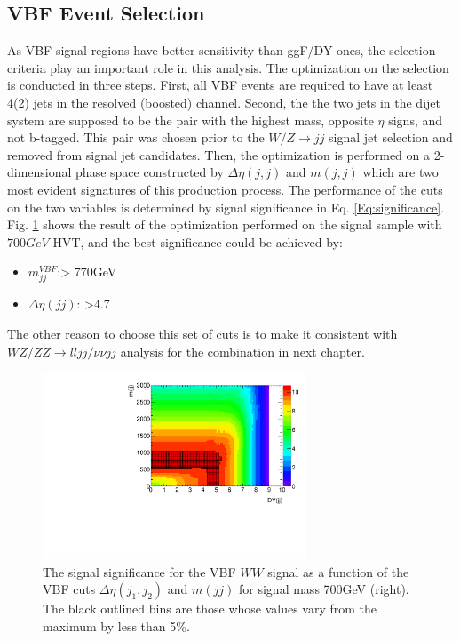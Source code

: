 \subsection{VBF Event Selection}
As VBF signal regions have better sensitivity than ggF/DY ones, the selection criteria play an important role in this analysis. The optimization on the selection is conducted in three steps. First, all VBF events are required to have at least 4(2) jets in the resolved (boosted) channel. Second, the the two jets in the dijet system are supposed to be the pair with the highest mass, opposite $\eta$ signs, and not b-tagged. This pair was chosen prior to the $W/Z\rightarrow jj$ signal jet selection and removed from signal jet candidates. Then, the optimization is performed on a 2-dimensional phase space constructed by $\Delta\eta(j,j)$ and $m(j,j)$ which are two most evident signatures of this production process. The performance of the cuts on the two variables is determined by signal significance in Eq. \ref{Eq:significance}. Fig. \ref{Fig:VBFOptimization} shows the result of the optimization performed on the signal sample with $700GeV$ HVT, and the best significance could be achieved by:
\begin{itemize}
	\item {\bf $m_{jj}^{VBF}$}:> 770GeV
	\item {\bf $\Delta\eta(jj)$}: >4.7
\end{itemize}
The other reason to choose this set of cuts is to make it consistent with $WZ/ZZ \rightarrow lljj/\nu\nu jj$ analysis for the combination in next chapter. 
\begin{figure}[h]
	\centering
	\includegraphics[width=0.7\textwidth]{Chapter3/VBF700_SignfSpace}
	\caption{The signal significance for the VBF $WW$ signal as a function of the VBF cuts $\Delta \eta(j_1,j_2)$ and $m(jj)$ for signal mass 700GeV (right). The black outlined bins are those whose values vary from the maximum by less than 5\%.}
	\label{Fig:VBFOptimization}
\end{figure}

